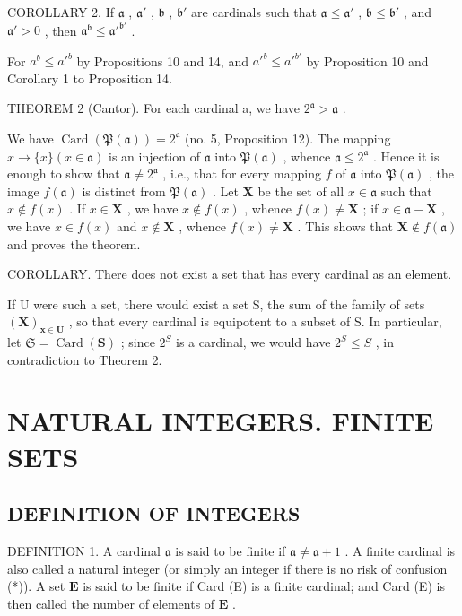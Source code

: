COROLLARY 2. If \(\mathfrak{a}\) , \(\mathfrak{a}'\) , \(\mathfrak{b}\) , \(\mathfrak{b}'\) are cardinals such that \(\mathfrak{a} \leqslant \mathfrak{a}'\) , \(\mathfrak{b} \leqslant \mathfrak{b}'\) , and \(\mathfrak{a}' > 0\) , then \(\mathfrak{a}^{\mathfrak{b}} \leqslant {\mathfrak{a}'}^{\mathfrak{b}'}\) .

For \(a^b \leqslant a'^b\) by Propositions 10 and 14, and \(a'^b \leqslant a'^{b'}\) by Proposition 10 and Corollary 1 to Proposition 14.

THEOREM 2 (Cantor). For each cardinal a, we have \(2^{\mathfrak{a}} > \mathfrak{a}\) .

We have \(\operatorname{Card}(\mathfrak{P}(\mathfrak{a})) = 2^{\mathfrak{a}}\) (no. 5, Proposition 12). The mapping \(x \to \{x\} (x \in \mathfrak{a})\) is an injection of \(\mathfrak{a}\) into \(\mathfrak{P}(\mathfrak{a})\) , whence \(\mathfrak{a} \leqslant 2^{\mathfrak{a}}\) . Hence it is enough to show that \(\mathfrak{a} \neq 2^{\mathfrak{a}}\) , i.e., that for every mapping \(f\) of \(\mathfrak{a}\) into \(\mathfrak{P}(\mathfrak{a})\) , the image \(f(\mathfrak{a})\) is distinct from \(\mathfrak{P}(\mathfrak{a})\) . Let \(\mathbf{X}\) be the set of all \(x \in \mathfrak{a}\) such that \(x \notin f(x)\) . If \(x \in \mathbf{X}\) , we have \(x \notin f(x)\) , whence \(f(x) \neq \mathbf{X}\) ; if \(x \in \mathfrak{a} - \mathbf{X}\) , we have \(x \in f(x)\) and \(x \notin \mathbf{X}\) , whence \(f(x) \neq \mathbf{X}\) . This shows that \(\mathbf{X} \notin f(\mathfrak{a})\) and proves the theorem.

COROLLARY. There does not exist a set that has every cardinal as an element.

If U were such a set, there would exist a set S, the sum of the family of sets \((\mathbf{X})_{\mathbf{x}\in\mathbf{U}}\) , so that every cardinal is equipotent to a subset of S. In particular, let \(\mathfrak{S}=\operatorname{Card}(\mathbf{S})\) ; since \(2^{S}\) is a cardinal, we would have \(2^{S}\leqslant S\) , in contradiction to Theorem 2.

\section{NATURAL INTEGERS. FINITE SETS}

\subsection{DEFINITION OF INTEGERS}

DEFINITION 1. A cardinal \(\mathfrak{a}\) is said to be finite if \(\mathfrak{a} \neq \mathfrak{a} + 1\) . A finite cardinal is also called a natural integer (or simply an integer if there is no risk of confusion (*)). A set \(\mathbf{E}\) is said to be finite if Card (E) is a finite cardinal; and Card (E) is then called the number of elements of \(\mathbf{E}\) .

